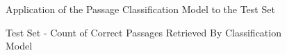 \begin{figure}
\centering
\vspace{1.0in}
\caption{Application of the Passage Classification Model to the Test Set}
\label{fig:logit_model_test_set_top}
\end{figure}

\begin{figure}
\centering
\vspace{1.0in}
\caption{Test Set - Count of Correct Passages Retrieved By Classification Model}
\label{fig:test_set_correct_passage_count}
\end{figure}




